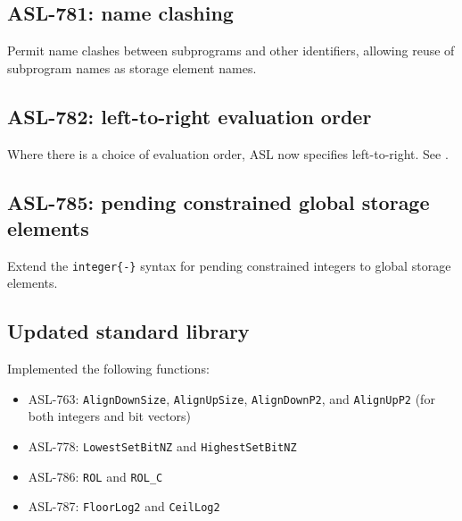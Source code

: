 
\subsection{ASL-781: name clashing}
Permit name clashes between subprograms and other identifiers, allowing reuse of subprogram names as storage element names.

\subsection{ASL-782: left-to-right evaluation order}
Where there is a choice of evaluation order, ASL now specifies left-to-right.
See .

\subsection{ASL-785: pending constrained global storage elements}
Extend the \texttt{integer\{-\}} syntax for pending constrained integers to global storage elements.

\subsection{Updated standard library}
Implemented the following functions:
\begin{itemize}
  \item ASL-763: \texttt{AlignDownSize}, \texttt{AlignUpSize}, \texttt{AlignDownP2}, and \texttt{AlignUpP2} (for both integers and bit vectors)
  \item ASL-778: \texttt{LowestSetBitNZ} and \texttt{HighestSetBitNZ}
  \item ASL-786: \texttt{ROL} and \texttt{ROL\_C}
  \item ASL-787: \texttt{FloorLog2} and \texttt{CeilLog2}
\end{itemize}

